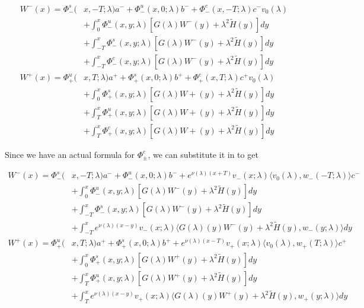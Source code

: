 \documentclass[12pt]{article}
\begin{document}
\begin{align*}
W^-(x) = \Phi^s_-(&x, -T; \lambda)a^- + \Phi^u_-(x, 0; \lambda)b^- + \Phi^c_-(x, -T; \lambda)c^- v_0(\lambda) \\
&+ \int_0^x \Phi^u_-(x, y; \lambda)[ G(\lambda)W^-(y) + \lambda^2 \tilde{H}(y) ] dy \\
&+ \int_{-T}^x \Phi^s_-(x, y; \lambda) [ G(\lambda)W^-(y) + \lambda^2 \tilde{H}(y) ] dy \\
&+ \int_{-T}^x \Phi^c_-(x, y; \lambda) [ G(\lambda)W^-(y) + \lambda^2 \tilde{H}(y) ]dy \\
W^+(x) = \Phi^u_+(&x, T; \lambda)a^+ + \Phi^s_+(x, 0; \lambda)b^+ + \Phi^c_+(x, T; \lambda)c^+ v_0(\lambda) \\
&+ \int_0^x \Phi^s_+(x, y; \lambda) [ G(\lambda)W+(y) + \lambda^2 \tilde{H}(y) ] dy \\
&+ \int_T^x \Phi^u_+(x, y; \lambda) [ G(\lambda)W+(y) + \lambda^2 \tilde{H}(y) ] dy \\
&+ \int_T^x \Phi^c_+(x, y; \lambda) [ G(\lambda)W+(y) + \lambda^2 \tilde{H}(y) ] dy
\end{align*}

Since we have an actual formula for $\Phi^c_\pm$, we can substitute it in to get

\begin{align*}
W^-(x) = \Phi^s_-(&x, -T; \lambda)a^- + \Phi^u_-(x, 0; \lambda)b^- + e^{\nu(\lambda)(x+T)} v_-(x; \lambda) \langle v_0(\lambda), w_-(-T; \lambda) \rangle c^- \\
&+ \int_0^x \Phi^u_-(x, y; \lambda)[ G(\lambda)W^-(y) + \lambda^2 \tilde{H}(y) ] dy \\
&+ \int_{-T}^x \Phi^s_-(x, y; \lambda) [ G(\lambda)W^-(y) + \lambda^2 \tilde{H}(y) ] dy \\
&+ \int_{-T}^x 
e^{\nu(\lambda)(x-y)} v_-(x; \lambda) \langle G(\lambda)(y)W^-(y) + \lambda^2 \tilde{H}(y), w_-(y; \lambda) \rangle dy \\
W^+(x) = \Phi^u_+(&x, T; \lambda)a^+ + \Phi^s_+(x, 0; \lambda)b^+ + e^{\nu(\lambda)(x - T)} v_+(x; \lambda) \langle v_0(\lambda), w_+(T; \lambda) \rangle c^+ \\
&+ \int_0^x \Phi^s_+(x, y; \lambda) [ G(\lambda)W^+(y) + \lambda^2 \tilde{H}(y) ] dy \\
&+ \int_T^x \Phi^u_+(x, y; \lambda) [ G(\lambda)W^+(y) + \lambda^2 \tilde{H}(y) ] dy \\
&+ \int_T^x e^{\nu(\lambda)(x-y)} v_+(x; \lambda) \langle G(\lambda)(y)W^+(y) + \lambda^2 \tilde{H}(y), w_+(y; \lambda) \rangle dy
\end{align*}
\end{document}
